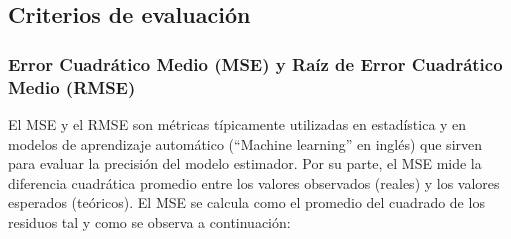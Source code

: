 









\subsection{Criterios de evaluación}
\subsubsection{Error Cuadrático Medio (MSE) y Raíz de Error Cuadrático Medio (RMSE)}
El MSE y el RMSE son métricas típicamente utilizadas en estadística y en modelos de aprendizaje automático (``Machine learning'' en inglés) que sirven para evaluar la precisión del modelo estimador. Por su parte, el MSE mide la diferencia cuadrática promedio entre los valores observados (reales) y los valores esperados (teóricos). El MSE se calcula como el promedio del cuadrado de  los residuos tal y como se observa a continuación:

